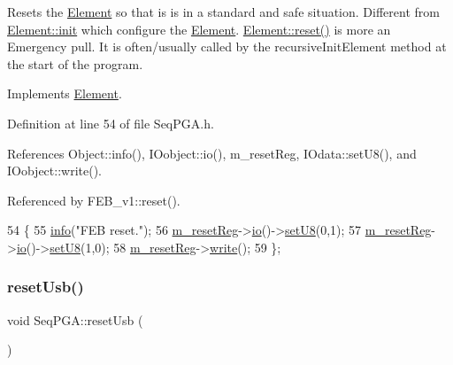 Resets the \hyperlink{classElement}{Element} so that is is in a standard and safe situation. Different from \hyperlink{classElement_af42754b5cabc198869222725218d695c}{Element\+::init} which configure the \hyperlink{classElement}{Element}. \hyperlink{classElement_a69efffa22f06909d768149715565cb56}{Element\+::reset()} is more an Emergency pull. It is often/usually called by the recursive\+Init\+Element method at the start of the program. 

Implements \hyperlink{classElement_a69efffa22f06909d768149715565cb56}{Element}.



Definition at line 54 of file Seq\+P\+G\+A.\+h.



References Object\+::info(), I\+Oobject\+::io(), m\+\_\+reset\+Reg, I\+Odata\+::set\+U8(), and I\+Oobject\+::write().



Referenced by F\+E\+B\+\_\+v1\+::reset().


\begin{DoxyCode}
54                \{
55     \hyperlink{classObject_a644fd329ea4cb85f54fa6846484b84a8}{info}(\textcolor{stringliteral}{"FEB reset."});
56     \hyperlink{classSeqPGA_a8c519e98b992ab872622e95dae4461d8}{m\_resetReg}->\hyperlink{classIOobject_af04fb94137c3d86849f478ac5afab5d1}{io}()->\hyperlink{classIOdata_a6c4fb2f2af01889ada889c2b7aceb24d}{setU8}(0,1);
57     \hyperlink{classSeqPGA_a8c519e98b992ab872622e95dae4461d8}{m\_resetReg}->\hyperlink{classIOobject_af04fb94137c3d86849f478ac5afab5d1}{io}()->\hyperlink{classIOdata_a6c4fb2f2af01889ada889c2b7aceb24d}{setU8}(1,0);
58     \hyperlink{classSeqPGA_a8c519e98b992ab872622e95dae4461d8}{m\_resetReg}->\hyperlink{classIOobject_a9f6984bc9f0fadcf800f1be2523ac744}{write}();
59   \};
\end{DoxyCode}
\mbox{\label{classSeqPGA_aea7d31e0cce81ea4dcad7d4534ff4493}} 
\subsubsection{\texorpdfstring{reset\+Usb()}{resetUsb()}}
{\footnotesize\ttfamily void Seq\+P\+G\+A\+::reset\+Usb (\begin{DoxyParamCaption}{ }\end{DoxyParamCaption})\hspace{0.3cm}{\ttfamily [inline]}}



